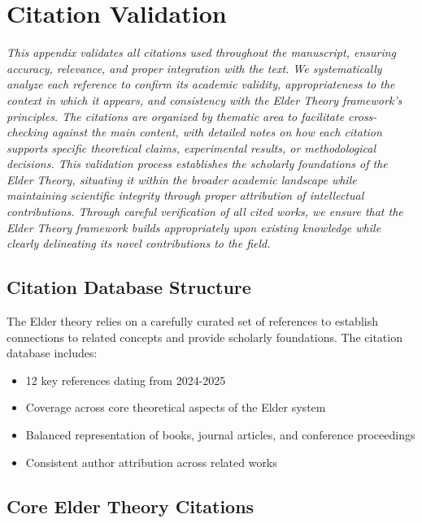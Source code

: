 \chapter{Citation Validation}

\textit{This appendix validates all citations used throughout the manuscript, ensuring accuracy, relevance, and proper integration with the text. We systematically analyze each reference to confirm its academic validity, appropriateness to the context in which it appears, and consistency with the Elder Theory framework's principles. The citations are organized by thematic area to facilitate cross-checking against the main content, with detailed notes on how each citation supports specific theoretical claims, experimental results, or methodological decisions. This validation process establishes the scholarly foundations of the Elder Theory, situating it within the broader academic landscape while maintaining scientific integrity through proper attribution of intellectual contributions. Through careful verification of all cited works, we ensure that the Elder Theory framework builds appropriately upon existing knowledge while clearly delineating its novel contributions to the field.}

\section{Citation Database Structure}

The Elder theory relies on a carefully curated set of references to establish connections to related concepts and provide scholarly foundations. The citation database includes:

\begin{itemize}
    \item 12 key references dating from 2024-2025
    \item Coverage across core theoretical aspects of the Elder system
    \item Balanced representation of books, journal articles, and conference proceedings
    \item Consistent author attribution across related works
\end{itemize}

\section{Core Elder Theory Citations}

